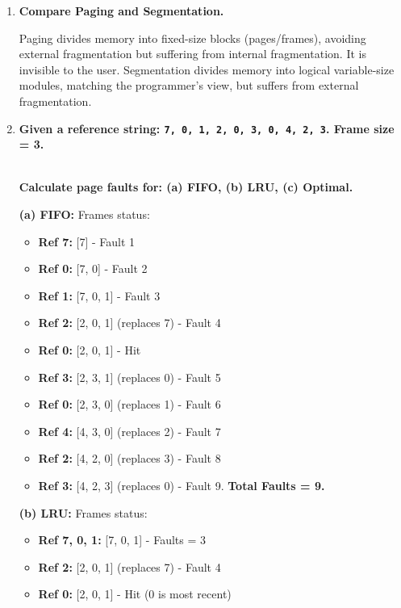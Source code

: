 \documentclass[12pt,a4paper]{article}
\newcommand{\Q}[1]{\textbf{#1}\par\noindent\ignorespaces}
\begin{document}
\begin{tcolorbox}[exambox, title={\textbf{Frequently Asked / Viva Questions}}]
\begin{enumerate}[topsep=0pt, label=\textbf{Q\arabic*.}, itemsep=5pt]
  \item \Q{Compare Paging and Segmentation.}
    Paging divides memory into fixed-size blocks (pages/frames), avoiding external fragmentation but suffering from internal fragmentation. It is invisible to the user. Segmentation divides memory into logical variable-size modules, matching the programmer's view, but suffers from external fragmentation.
  \item \Q{Given a reference string: \texttt{7, 0, 1, 2, 0, 3, 0, 4, 2, 3}. Frame size = 3.}\\
    \textbf{Calculate page faults for: (a) FIFO, (b) LRU, (c) Optimal.}\par
    \textbf{(a) FIFO:} Frames status:\par
    \begin{itemize}[leftmargin=*, itemsep=2.5pt, topsep=2pt]
      \item \textbf{Ref 7:} [7] - Fault 1
      \item \textbf{Ref 0:} [7, 0] - Fault 2
      \item \textbf{Ref 1:} [7, 0, 1] - Fault 3
      \item \textbf{Ref 2:} [2, 0, 1] (replaces 7) - Fault 4
      \item \textbf{Ref 0:} [2, 0, 1] - Hit
      \item \textbf{Ref 3:} [2, 3, 1] (replaces 0) - Fault 5
      \item \textbf{Ref 0:} [2, 3, 0] (replaces 1) - Fault 6
      \item \textbf{Ref 4:} [4, 3, 0] (replaces 2) - Fault 7
      \item \textbf{Ref 2:} [4, 2, 0] (replaces 3) - Fault 8
      \item \textbf{Ref 3:} [4, 2, 3] (replaces 0) - Fault 9. \textbf{Total Faults = 9.}
    \end{itemize}
    \textbf{(b) LRU:} Frames status:\par
    \begin{itemize}[leftmargin=*, itemsep=2.5pt, topsep=2pt]
      \item \textbf{Ref 7, 0, 1:} [7, 0, 1] - Faults = 3
      \item \textbf{Ref 2:} [2, 0, 1] (replaces 7) - Fault 4
      \item \textbf{Ref 0:} [2, 0, 1] - Hit (0 is most recent)

\end{itemize}
\end{enumerate}
\end{tcolorbox}
\end{document}
